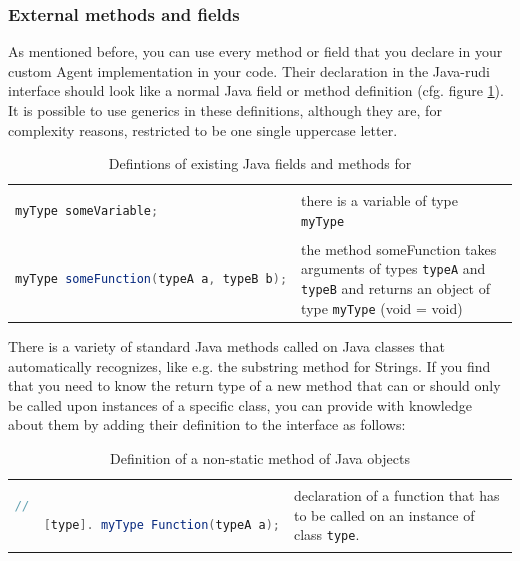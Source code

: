 \subsubsection{External methods and fields}
\label{sec:javatypes}

As mentioned before, you can use every method or field that you declare in your custom Agent implementation in your \vonda code. Their declaration in the Java-rudi interface should look like a normal Java field or method definition (cfg. figure \ref{tab:javadef}). It is possible to use generics in these definitions, although they are, for complexity reasons, restricted to be one single uppercase letter.

\begin{table}[htbp]
  \small
  \begin{tabular}{lp{}}
    \begin{lstlisting}[language=Java]
    myType someVariable;
    \end{lstlisting}
    &  there is a variable of type \texttt{myType} \\

    \begin{lstlisting}[language=Java]
    myType someFunction(typeA a, typeB b);
    \end{lstlisting}
    &  the method someFunction takes arguments of types \texttt{typeA} and
      \texttt{typeB} and returns an object of type \texttt{myType} (void =
      void)
  \end{tabular}

  \caption{Defintions of existing Java fields and methods for \vonda}
  \label{tab:javadef}
\end{table}

There is a variety of standard Java methods called on Java classes that \vonda automatically recognizes, like e.g. the substring method for Strings. If you find that you need \vonda to know the return type of a new method that can or should only be called upon instances of a specific class, you can provide \vonda with knowledge about them by adding their definition to the interface as follows:


\begin{table}[htbp]
  \centering
  \small
  \begin{tabular}{lp{}}

    \begin{lstlisting}[language=Java]
    //
    [type]. myType Function(typeA a);
    \end{lstlisting}
    & declaration of a function that has to be called on an instance of class \texttt{type}.
  \end{tabular}

  \caption{Definition of a non-static method of Java objects}
  \label{tab:methoddef}
\end{table}

